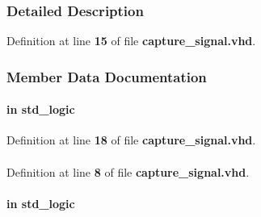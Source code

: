 \subsubsection{Detailed Description}


Definition at line {\bf 15} of file {\bf capture\+\_\+signal.\+vhd}.



\subsubsection{Member Data Documentation}
\paragraph[{clk}]{ {\bfseries \textcolor{keywordflow}{in}\textcolor{vhdlchar}{ }} {\bfseries \textcolor{comment}{std\+\_\+logic}\textcolor{vhdlchar}{ }} \hspace{0.3cm}{\ttfamily [Port]}}\label{classcapture__signal_a4a4609c199d30b3adebbeb3a01276ec5}


Definition at line {\bf 18} of file {\bf capture\+\_\+signal.\+vhd}.

\paragraph[{ieee}]{\hspace{0.3cm}{\ttfamily [Library]}}\label{classcapture__signal_a0a6af6eef40212dbaf130d57ce711256}


Definition at line {\bf 8} of file {\bf capture\+\_\+signal.\+vhd}.

\paragraph[{in\+\_\+sig}]{ {\bfseries \textcolor{keywordflow}{in}\textcolor{vhdlchar}{ }} {\bfseries \textcolor{comment}{std\+\_\+logic}\textcolor{vhdlchar}{ }} \hspace{0.3cm}{\ttfamily [Port]}}\label{classcapture__signal_af37e8b1cad4b5a0b1ef4791b6f65182e}


